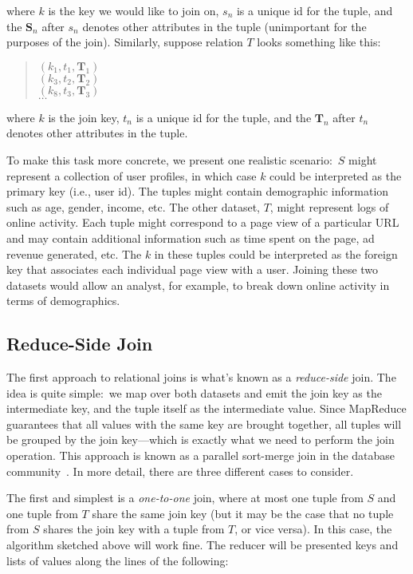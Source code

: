 \noindent where $k$ is the key we would like to join on, $s_n$ is a
unique id for the tuple, and the $\textbf{S}_n$ after $s_n$ denotes
other attributes in the tuple (unimportant for the purposes of the
join).  Similarly, suppose relation $T$ looks something like this:

\begin{quote}
$(k_1, t_1, \textbf{T}_1)$ \\
$(k_3, t_2, \textbf{T}_2)$ \\
$(k_8, t_3, \textbf{T}_3)$ \\
$\ldots$
\end{quote}

\noindent where $k$ is the join key, $t_n$ is a unique id for the
tuple, and the $\textbf{T}_n$ after $t_n$ denotes other attributes in the
tuple.  

To make this task more concrete, we present one realistic
scenario:\ $S$ might represent a collection of user profiles, in which
case $k$ could be interpreted as the primary key (i.e., user id).  The
tuples might contain demographic information such as age, gender,
income, etc.  The other dataset, $T$, might represent logs of online
activity.  Each tuple might correspond to a page view of a particular
URL and may contain additional information such as time spent on the
page, ad revenue generated, etc.  The $k$ in these tuples could be
interpreted as the foreign key that associates each individual page
view with a user.  Joining these two datasets would allow an analyst,
for example, to break down online activity in terms of demographics.

\subsection{Reduce-Side Join}

The first approach to relational joins is what's known as a \emph{
  reduce-side} join.  The idea is quite simple:\ we map over both
datasets and emit the join key as the intermediate key, and the tuple
itself as the intermediate value.  Since MapReduce guarantees that all
values with the same key are brought together, all tuples will be
grouped by the join key---which is exactly what we need to perform the
join operation.  This approach is known as a parallel sort-merge join
in the database community~\cite{Schneider_DeWitt_SIGMOD1989}.  In more
detail, there are three different cases to consider.

The first and simplest is a \emph{one-to-one} join, where at most one
tuple from $S$ and one tuple from $T$ share the same join key (but
it may be the case that no tuple from $S$ shares the join key with a
tuple from $T$, or vice versa).  In this case, the algorithm sketched
above will work fine.  The reducer will be presented keys and lists of
values along the lines of the following:

